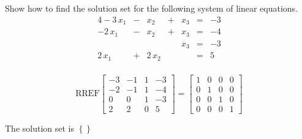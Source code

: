 
\begin{exerciseStatement}


Show how to find the solution set for the following system of linear equations. 
\begin{alignat*}{4} -3 \, x_{1} &-& x_{2} &+& x_{3} &=& -3 \\-2 \, x_{1} &-& x_{2} &+& x_{3} &=& -4 \\ & &  & & x_{3} &=& -3 \\2 \, x_{1} &+& 2 \, x_{2} & &  &=& 5 \\ \end{alignat*}
            


\end{exerciseStatement}
    
\begin{exerciseAnswer} 
\[\mathrm{RREF} \left[\begin{array}{ccc|c}
-3 & -1 & 1 & -3 \\
-2 & -1 & 1 & -4 \\
0 & 0 & 1 & -3 \\
2 & 2 & 0 & 5
\end{array}\right]  =  \left[\begin{array}{ccc|c}
1 & 0 & 0 & 0 \\
0 & 1 & 0 & 0 \\
0 & 0 & 1 & 0 \\
0 & 0 & 0 & 1
\end{array}\right] \]

The solution set is \( \left\{\right\} \)


\end{exerciseAnswer}
    
